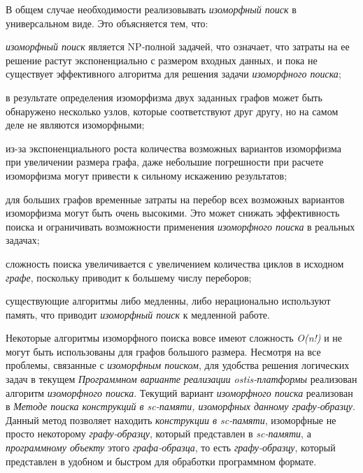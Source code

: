 В общем случае  необходимости реализовывать \textit{изоморфный поиск} в универсальном виде. Это объясняется тем, что:
\begin{textitemize}
	\item \textit{изоморфный поиск} является NP-полной задачей, что означает, что затраты на ее решение растут экспоненциально с размером входных данных, и пока не существует эффективного алгоритма для решения задачи \textit{изоморфного поиска};
	\item в результате определения изоморфизма двух заданных графов может быть обнаружено несколько узлов, которые соответствуют друг другу, но на самом деле не являются изоморфными;
	\item из-за экспоненциального роста количества возможных вариантов изоморфизма при увеличении размера графа, даже небольшие погрешности при расчете изоморфизма могут привести к сильному искажению результатов;
	\item для больших графов временные затраты на перебор всех возможных вариантов изоморфизма могут быть очень высокими. Это может снижать эффективность поиска и ограничивать возможности применения \textit{изоморфного поиска} в реальных задачах;
	\item сложность поиска увеличивается с увеличением количества циклов в исходном \textit{графе}, поскольку приводит к большему числу переборов;
	\item существующие алгоритмы либо медленны, либо нерационально используют память, что приводит \textit{изоморфный поиск }к медленной работе.
\end{textitemize}

Некоторые алгоритмы изоморфного поиска вовсе имеют сложность \textit{O(n!)} и не могут быть использованы для графов большого размера. Несмотря на все проблемы, связанные с \textit{изоморфным поиском}, для удобства решения логических задач в текущем \textit{Программном варианте реализации ostis-платформы} реализован  алгоритм \textit{изоморфного поиска}. Текущий вариант \textit{изоморфного поиска} реализован в \textit{Методе поиска конструкций в sc-памяти, изоморфных данному графу-образцу}. Данный метод позволяет находить \textit{конструкции в sc-памяти}, изоморфные не просто некоторому \textit{графу-образцу}, который представлен в \textit{sc-памяти}, а \textit{программному объекту} этого \textit{графа-образца}, то есть \textit{графу-образцу}, который представлен в удобном и быстром для обработки программном формате.

